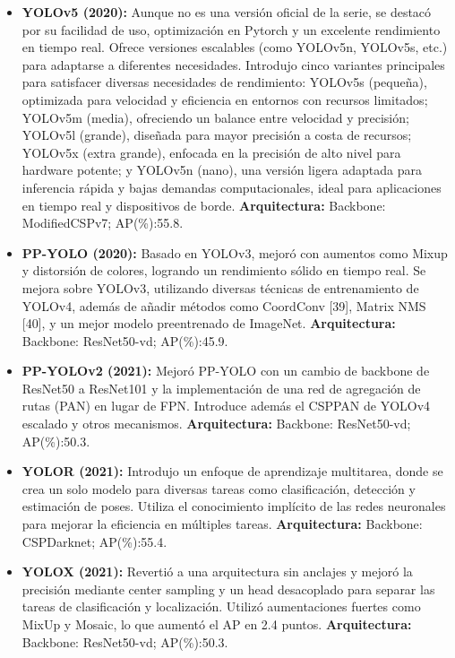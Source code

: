 \begin{itemize}
    \item \textbf{YOLOv5 (2020):} Aunque no es una versión oficial de la serie, se destacó por su facilidad de uso, optimización en Pytorch y un excelente rendimiento en tiempo real. Ofrece versiones escalables (como YOLOv5n, YOLOv5s, etc.) para adaptarse a diferentes necesidades. Introdujo cinco variantes principales para satisfacer diversas necesidades de rendimiento: YOLOv5s (pequeña), optimizada para velocidad y eficiencia en entornos con recursos limitados; YOLOv5m (media), ofreciendo un balance entre velocidad y precisión; YOLOv5l (grande), diseñada para mayor precisión a costa de recursos; YOLOv5x (extra grande), enfocada en la precisión de alto nivel para hardware potente; y YOLOv5n (nano), una versión ligera adaptada para inferencia rápida y bajas demandas computacionales, ideal para aplicaciones en tiempo real y dispositivos de borde.
    \textbf{Arquitectura:} Backbone: ModifiedCSPv7; AP(\%):55.8.
     
    \item \textbf{PP-YOLO (2020):} Basado en YOLOv3, mejoró con aumentos como Mixup y distorsión de colores, logrando un rendimiento sólido en tiempo real. Se mejora sobre YOLOv3, utilizando diversas técnicas de entrenamiento de YOLOv4, además de añadir métodos como CoordConv [39], Matrix NMS [40], y un mejor modelo preentrenado de ImageNet.
    \textbf{Arquitectura:} Backbone: ResNet50-vd; AP(\%):45.9.
    
    \item \textbf{PP-YOLOv2 (2021):} Mejoró PP-YOLO con un cambio de backbone de ResNet50 a ResNet101 y la implementación de una red de agregación de rutas (PAN) en lugar de FPN.  Introduce además el CSPPAN de YOLOv4 escalado y otros mecanismos.
    \textbf{Arquitectura:} Backbone: ResNet50-vd; AP(\%):50.3.
    
    \item \textbf{YOLOR (2021):} Introdujo un enfoque de aprendizaje multitarea, donde se crea un solo modelo para diversas tareas como clasificación, detección y estimación de poses. Utiliza el conocimiento implícito de las redes neuronales para mejorar la eficiencia en múltiples tareas.
    \textbf{Arquitectura:} Backbone: CSPDarknet; AP(\%):55.4.
    
    \item \textbf{YOLOX (2021):} Revertió a una arquitectura sin anclajes y mejoró la precisión mediante center sampling y un head desacoplado para separar las tareas de clasificación y localización. Utilizó aumentaciones fuertes como MixUp y Mosaic, lo que aumentó el AP en 2.4 puntos. 
    \textbf{Arquitectura:} Backbone:  ResNet50-vd; AP(\%):50.3.
    

\end{itemize}

